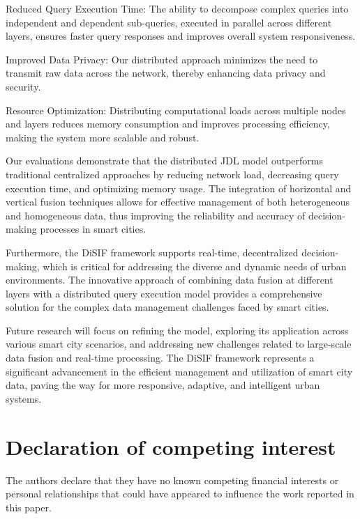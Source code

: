 \documentclass[5p,times]{elsarticle}
\begin{document}
Reduced Query Execution Time: The ability to decompose complex queries into independent and dependent sub-queries, executed in parallel across different layers, ensures faster query responses and improves overall system responsiveness. 

Improved Data Privacy: Our distributed approach minimizes the need to transmit raw data across the network, thereby enhancing data privacy and security.

Resource Optimization: Distributing computational loads across multiple nodes and layers reduces memory consumption and improves processing efficiency, making the system more scalable and robust.

Our evaluations demonstrate that the distributed JDL model outperforms traditional centralized approaches by reducing network load, decreasing query execution time, and optimizing memory usage. The integration of horizontal and vertical fusion techniques allows for effective management of both heterogeneous and homogeneous data, thus improving the reliability and accuracy of decision-making processes in smart cities.

Furthermore, the DiSIF framework supports real-time, decentralized decision-making, which is critical for addressing the diverse and dynamic needs of urban environments. The innovative approach of combining data fusion at different layers with a distributed query execution model provides a comprehensive solution for the complex data management challenges faced by smart cities.

Future research will focus on refining the model, exploring its application across various smart city scenarios, and addressing new challenges related to large-scale data fusion and real-time processing. The DiSIF framework represents a significant advancement in the efficient management and utilization of smart city data, paving the way for more responsive, adaptive, and intelligent urban systems.

\section{Declaration of competing interest}

The authors declare that they have no known competing financial
interests or personal relationships that could have appeared
to influence the work reported in this paper.

\end{document}

